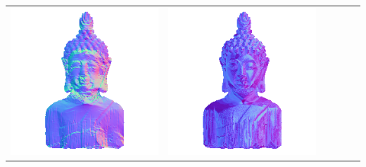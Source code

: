 \begin{center}
\begin{tabularx}{\linewidth}{@{}Y@{}Y@{}Y@{}Y@{}Y@{}Y@{}}
\includegraphics[width=\linewidth]{semisynthetic/20160617_16_yu_out.png} &
\includegraphics[width=\linewidth]{semisynthetic/20160617_16_dpsn_out.png} &

\end{tabularx}
\end{center}
